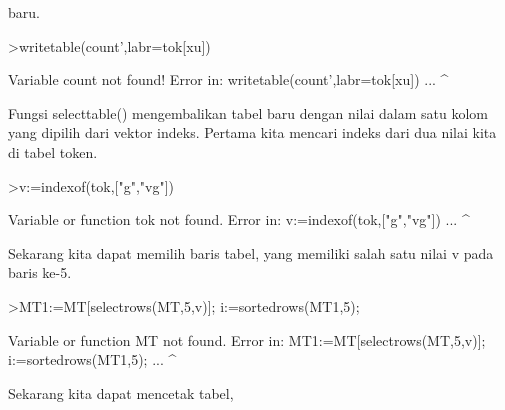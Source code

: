\documentclass[a4paper,10pt]{article}
\begin{document}
\begin{eulernotebook}
\begin{eulercomment}
\begin{eulercomment}
\begin{eulercomment}
\begin{eulercomment}
\begin{eulercomment}
\begin{eulercomment}
\begin{eulercomment}
\begin{eulercomment}
\begin{eulercomment}
\begin{eulercomment}
\begin{eulercomment}
\begin{eulercomment}
\begin{eulercomment}
\begin{eulercomment}
\begin{eulercomment}
\begin{eulercomment}
\begin{eulercomment}
\begin{eulercomment}
\begin{eulercomment}
\begin{eulercomment}
\begin{eulercomment}
\begin{eulercomment}
\begin{eulercomment}
\begin{eulercomment}
\begin{eulercomment}
\begin{eulercomment}
\begin{eulercomment}
\begin{eulercomment}
\begin{eulercomment}
\begin{eulercomment}
\begin{eulercomment}
\begin{eulercomment}
\begin{eulercomment}
\begin{eulercomment}
\begin{eulercomment}
\begin{eulercomment}
\begin{eulercomment}
\begin{eulercomment}
\begin{eulercomment}
\begin{eulercomment}
\begin{eulercomment}
\begin{eulercomment}
\begin{eulercomment}
\begin{eulercomment}
\begin{eulercomment}
\begin{eulercomment}
\begin{eulercomment}
\begin{eulercomment}
\begin{eulercomment}
\begin{eulercomment}
\begin{eulercomment}
\begin{eulercomment}
\begin{eulercomment}
\begin{eulercomment}
\begin{eulercomment}
\begin{eulercomment}
\begin{eulercomment}
\begin{eulercomment}
\begin{eulercomment}
\begin{eulercomment}
\begin{eulercomment}
\begin{eulercomment}
\begin{eulercomment}
\begin{eulercomment}
\begin{eulercomment}
\begin{eulercomment}
\begin{eulercomment}
baru.
\end{eulercomment}
\begin{eulerprompt}
>writetable(count',labr=tok[xu])
\end{eulerprompt}
\begin{euleroutput}
  Variable count not found!
  Error in:
  writetable(count',labr=tok[xu]) ...
                   ^
\end{euleroutput}
\begin{eulercomment}
Fungsi selecttable() mengembalikan tabel baru dengan nilai dalam satu
kolom yang dipilih dari vektor indeks. Pertama kita mencari indeks
dari dua nilai kita di tabel token.
\end{eulercomment}
\begin{eulerprompt}
>v:=indexof(tok,["g","vg"])
\end{eulerprompt}
\begin{euleroutput}
  Variable or function tok not found.
  Error in:
  v:=indexof(tok,["g","vg"]) ...
                ^
\end{euleroutput}
\begin{eulercomment}
Sekarang kita dapat memilih baris tabel, yang memiliki salah satu
nilai v pada baris ke-5.
\end{eulercomment}
\begin{eulerprompt}
>MT1:=MT[selectrows(MT,5,v)]; i:=sortedrows(MT1,5);
\end{eulerprompt}
\begin{euleroutput}
  Variable or function MT not found.
  Error in:
  MT1:=MT[selectrows(MT,5,v)]; i:=sortedrows(MT1,5); ...
                       ^
\end{euleroutput}
\begin{eulercomment}
Sekarang kita dapat mencetak tabel, 
\end{eulercomment}
\end{eulercomment}
\end{eulercomment}
\end{eulercomment}
\end{eulercomment}
\end{eulercomment}
\end{eulercomment}
\end{eulercomment}
\end{eulercomment}
\end{eulercomment}
\end{eulercomment}
\end{eulercomment}
\end{eulercomment}
\end{eulercomment}
\end{eulercomment}
\end{eulercomment}
\end{eulercomment}
\end{eulercomment}
\end{eulercomment}
\end{eulercomment}
\end{eulercomment}
\end{eulercomment}
\end{eulercomment}
\end{eulercomment}
\end{eulercomment}
\end{eulercomment}
\end{eulercomment}
\end{eulercomment}
\end{eulercomment}
\end{eulercomment}
\end{eulercomment}
\end{eulercomment}
\end{eulercomment}
\end{eulercomment}
\end{eulercomment}
\end{eulercomment}
\end{eulercomment}
\end{eulercomment}
\end{eulercomment}
\end{eulercomment}
\end{eulercomment}
\end{eulercomment}
\end{eulercomment}
\end{eulercomment}
\end{eulercomment}
\end{eulercomment}
\end{eulercomment}
\end{eulercomment}
\end{eulercomment}
\end{eulercomment}
\end{eulercomment}
\end{eulercomment}
\end{eulercomment}
\end{eulercomment}
\end{eulercomment}
\end{eulercomment}
\end{eulercomment}
\end{eulercomment}
\end{eulercomment}
\end{eulercomment}
\end{eulercomment}
\end{eulercomment}
\end{eulercomment}
\end{eulercomment}
\end{eulercomment}
\end{eulercomment}
\end{eulercomment}
\end{eulernotebook}
\end{document}
